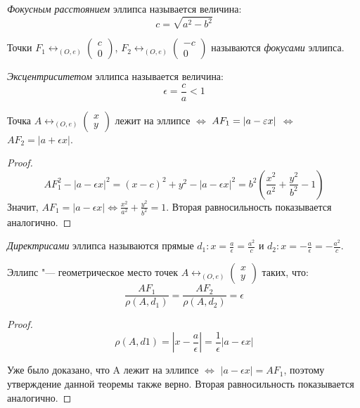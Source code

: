 \begin{definition}
	\textit{Фокусным расстоянием} эллипса называется величина:
	\[c = \sqrt{a^2 - b^2}\]
	
	Точки $F_1 \leftrightarrow_{(O, e)} \begin{pmatrix}c\\0\end{pmatrix}$, $F_2 \leftrightarrow_{(O, e)} \begin{pmatrix}-c\\0\end{pmatrix}$ называются \textit{фокусами} эллипса.
\end{definition}

\begin{definition}
	\textit{Эксцентриситетом} эллипса называется величина:
	\[\epsilon = \frac{c}{a} < 1\]
\end{definition}

\begin{theorem}
	Точка $A \leftrightarrow_{(O, e)}\begin{pmatrix}x\\y\end{pmatrix}$ лежит на эллипсе $\Leftrightarrow$ $AF_1 \hm{=} |a - \epsilon  x|$ $\Leftrightarrow$ $AF_2 = |a + \epsilon x|$.
\end{theorem}

\begin{proof}
	\[AF_1^2 - |a - \epsilon x|^2 = (x - c)^2 + y^2 - |a - \epsilon x|^2 = b^2\left(\frac{x^2}{a^2}+\frac{y^2}{b^2} - 1\right)\]
	Значит, $AF_1 = |a - \epsilon x| \Leftrightarrow
	\frac{x^2}{a^2}+\frac{y^2}{b^2} = 1$. Вторая равносильность показывается аналогично.
\end{proof}

\begin{definition}
	\textit{Директрисами} эллипса называются прямые $d_1: x = \frac{a}{\epsilon} = \frac{a^2}{c}$ и $d_2: x = -\frac{a}{\epsilon} = -\frac{a^2}{c}$.
\end{definition}

\begin{theorem}
	Эллипс "--- геометрическое место точек $A \leftrightarrow_{(O, e)} \begin{pmatrix}x\\y\end{pmatrix}$ таких, что:
	\[\frac{AF_1}{\rho(A, d_1)} = \frac{AF_2}{\rho(A, d_2)} = \epsilon\]
\end{theorem}

\begin{proof}
	\[\rho(A, d1) = |x - \frac{a}{\epsilon}| = \frac{1}{\epsilon}|a - \epsilon x|\]
	
	Уже было доказано, что A лежит на эллипсе $\Leftrightarrow$ $|a - \epsilon x| = AF_1$, поэтому утверждение данной теоремы также верно. Вторая равносильность показывается аналогично.
\end{proof}

